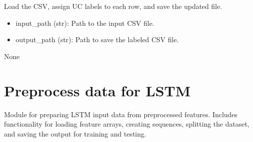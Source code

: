 \documentclass[letterpaper,10pt,english]{sphinxmanual}
\begin{document}

\begin{fulllineitems}
\label{\detokenize{add_current_uc:add_current_uc.label_realnetwork_csv}}
\pysigstartsignatures
{}
\pysigstopsignatures
\sphinxAtStartPar
Load the CSV, assign UC labels to each row, and save the updated file.
\begin{description}
\begin{itemize}
\item {} 
\sphinxAtStartPar
input\_path (str): Path to the input CSV file.

\item {} 
\sphinxAtStartPar
output\_path (str): Path to save the labeled CSV file.

\end{itemize}

\sphinxAtStartPar
None

\end{description}

\end{fulllineitems}


\sphinxstepscope


\chapter{Preprocess data for LSTM}
\label{\detokenize{lstm_preprocessing:module-lstm_preprocessing}}\label{\detokenize{lstm_preprocessing:preprocess-data-for-lstm}}\label{\detokenize{lstm_preprocessing::doc}}
\sphinxAtStartPar
Module for preparing LSTM input data from preprocessed features.
Includes functionality for loading feature arrays, creating sequences,
splitting the dataset, and saving the output for training and testing.
\end{document}
